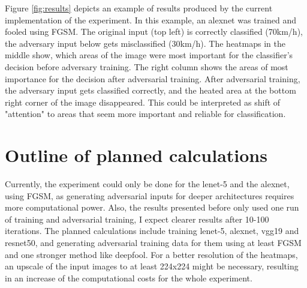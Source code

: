 \documentclass[draft,final]{vutinfth} %
\begin{document}
Figure \ref{fig:results} depicts an example of results produced by the current implementation of the experiment. In this example, an alexnet was trained and fooled using FGSM. The original input (top left) is correctly classified (70km/h), the adversary input below gets misclassified (30km/h). The heatmaps in the middle show, which areas of the image were most important for the classifier's decision before adversary training. The right column shows the areas of most importance for the decision after adversarial training. After adversarial training, the adversary input gets classified correctly, and the heated area at the bottom right corner of the image disappeared. This could be interpreted as shift of "attention" to areas that seem more important and reliable for classification.

\chapter{Outline of planned calculations}

Currently, the experiment could only be done for the lenet-5 and the alexnet, using FGSM, as generating adversarial inputs for deeper architectures requires more computational power. Also, the results presented before only used one run of training and adversarial training, I expect clearer results after 10-100 iterations.
The planned calculations include training lenet-5, alexnet, vgg19 and resnet50, and generating adversarial training data for them using at least FGSM and one stronger method like deepfool. For a better resolution of the heatmaps, an upscale of the input images to at least 224x224 might be necessary, resulting in an increase of the computational costs for the whole experiment.


\backmatter

\listoffigures %

\listoftables %

\listofalgorithms
{}

\printindex

\printglossaries



\end{document}
